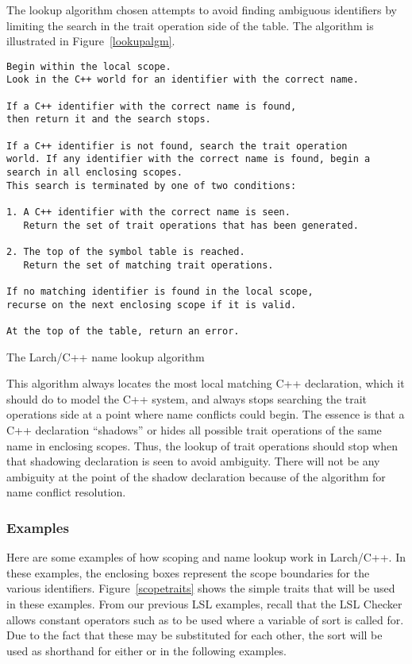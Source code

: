The lookup algorithm chosen attempts to avoid finding ambiguous
identifiers by limiting the search in the trait operation side of the
table. The algorithm is illustrated in Figure~\ref{lookupalgm}.
\begin{BFIGURE}
\begin{verbatim}
Begin within the local scope.  
Look in the C++ world for an identifier with the correct name.

If a C++ identifier with the correct name is found, 
then return it and the search stops.

If a C++ identifier is not found, search the trait operation
world. If any identifier with the correct name is found, begin a
search in all enclosing scopes. 
This search is terminated by one of two conditions:

1. A C++ identifier with the correct name is seen. 
   Return the set of trait operations that has been generated.

2. The top of the symbol table is reached.
   Return the set of matching trait operations.

If no matching identifier is found in the local scope,
recurse on the next enclosing scope if it is valid. 

At the top of the table, return an error.

\end{verbatim}
\caption{The Larch/C++ name lookup algorithm}
\label{lookupalgm}
\end{BFIGURE}

This algorithm always locates the most local matching C++ declaration,
which it should do to model the C++ system, and always stops searching
the trait operations side at a point where name conflicts could
begin. The essence is that a C++ declaration ``shadows'' or hides all
possible trait operations of the same name in enclosing scopes. Thus,
the lookup of trait operations should stop when that shadowing
declaration is seen to avoid ambiguity. There will not
be any ambiguity at the point of the shadow declaration because of the
algorithm for name conflict resolution.

\subsubsection{Examples}
Here are some examples of how scoping and name lookup work in
Larch/C++. In these examples, the enclosing boxes represent the scope
boundaries for the various identifiers. Figure~\ref{scopetraits} shows
the simple traits that will be used in these examples. From our
previous LSL examples, recall that the LSL Checker allows constant
operators such as  to be used where a variable of
sort  is called for. Due to the fact that these may be
substituted for each other, the sort  will be used
as shorthand for either  or  in the
following examples.


